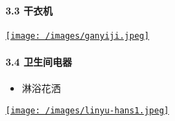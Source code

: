 \documentclass[]{article}
\providecommand{\tightlist}{%
  \setlength{\itemsep}{0pt}\setlength{\parskip}{0pt}}
\let\oldparagraph\paragraph
\renewcommand{\paragraph}[1]{\oldparagraph{#1}\mbox{}}
\begin{document}
\paragraph{3.3 干衣机}

\href{https://item.jd.com/100002979925.html\#crumb-wrap}{\texttt{[image: /images/ganyiji.jpeg]}}

\paragraph{3.4 卫生间电器}

\begin{itemize}
\tightlist
\item
  淋浴花洒
\end{itemize}

\href{https://item.taobao.com/item.htm?spm=a230r.1.14.15.75174969uHjSCl\&id=557954573996\&ns=1\&abbucket=16\#detail}{\texttt{[image: /images/linyu-hans1.jpeg]}}
\end{document}
